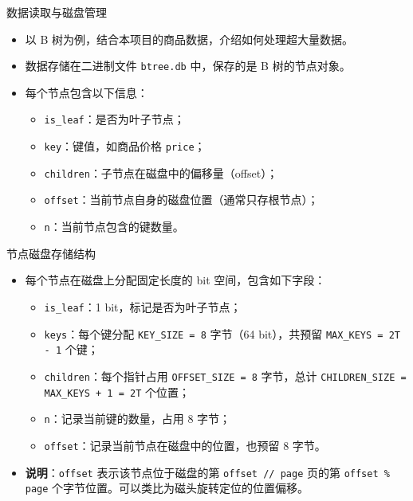\documentclass{beamer}
\begin{document}
\begin{frame}{数据读取与磁盘管理}
\begin{itemize}
  \item 以 B 树为例，结合本项目的商品数据，介绍如何处理超大量数据。
  \item 数据存储在二进制文件 \texttt{btree.db} 中，保存的是 B 树的节点对象。
  \item 每个节点包含以下信息：
  \begin{itemize}
    \item \texttt{is\_leaf}：是否为叶子节点；
    \item \texttt{key}：键值，如商品价格 \texttt{price}；
    \item \texttt{children}：子节点在磁盘中的偏移量（offset）；
    \item \texttt{offset}：当前节点自身的磁盘位置（通常只存根节点）；
    \item \texttt{n}：当前节点包含的键数量。
  \end{itemize}
\end{itemize}
\end{frame}

\begin{frame}{节点磁盘存储结构}
\begin{itemize}
  \item 每个节点在磁盘上分配固定长度的 bit 空间，包含如下字段：
  \begin{itemize}
    \item \texttt{is\_leaf}：1 bit，标记是否为叶子节点；
    \item \texttt{keys}：每个键分配 \texttt{KEY\_SIZE = 8} 字节（64 bit），共预留 \texttt{MAX\_KEYS = 2T - 1} 个键；
    \item \texttt{children}：每个指针占用 \texttt{OFFSET\_SIZE = 8} 字节，总计 \texttt{CHILDREN\_SIZE = MAX\_KEYS + 1 = 2T} 个位置；
    \item \texttt{n}：记录当前键的数量，占用 8 字节；
    \item \texttt{offset}：记录当前节点在磁盘中的位置，也预留 8 字节。
  \end{itemize}
  \item \textbf{说明}：\texttt{offset} 表示该节点位于磁盘的第 \texttt{offset // page} 页的第 \texttt{offset \% page} 个字节位置。可以类比为磁头旋转定位的位置偏移。
\end{itemize}
\end{frame}
\end{document}
